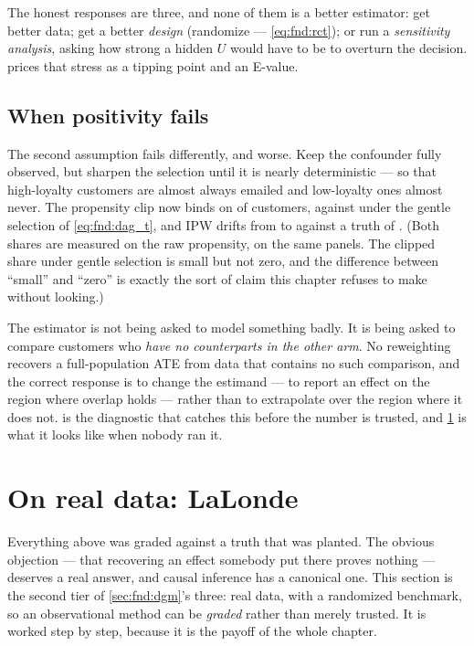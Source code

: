 The honest responses are three, and none of them is a better estimator: get better data; get a
better \emph{design} (randomize --- \cref{eq:fnd:rct}); or run a \emph{sensitivity analysis},
asking how strong a hidden $U$ would have to be to overturn the decision.  prices
that stress as a tipping point and an E-value.

\subsection*{When positivity fails}

The second assumption fails differently, and worse. Keep the confounder fully observed, but
sharpen the selection until it is nearly deterministic --- so that high-loyalty customers are
almost always emailed and low-loyalty ones almost never. The propensity clip now binds on
\pc{\nbZeroPosClipBad} of customers, against \pc{\nbZeroPosClipOk} under the gentle selection of
\cref{eq:fnd:dag_t}, and IPW drifts from \eur{\nbZeroPosIpwOk} to \eur{\nbZeroPosIpwBad} against
a truth of \eur{\nbZeroTrueDag}. (Both shares are measured on the raw propensity, on the same
panels. The clipped share under gentle selection is small but not zero, and the difference
between ``small'' and ``zero'' is exactly the sort of claim this chapter refuses to make without
looking.)

The estimator is not being asked to model something badly. It is being asked to compare customers
who \emph{have no counterparts in the other arm}. No reweighting recovers a full-population ATE
from data that contains no such comparison, and the correct response is to change the estimand
--- to report an effect on the region where overlap holds --- rather than to extrapolate over the
region where it does not.  is the diagnostic that catches this before the
number is trusted, and \cref{sec:fnd:real} is what it looks like when nobody ran it.

\section{On real data: LaLonde}
\label{sec:fnd:real}

Everything above was graded against a truth that was planted. The obvious objection --- that
recovering an effect somebody put there proves nothing --- deserves a real answer, and causal
inference has a canonical one. This section is the second tier of \cref{sec:fnd:dgm}'s three:
real data, with a randomized benchmark, so an observational method can be \emph{graded} rather
than merely trusted. It is worked step by step, because it is the payoff of the whole chapter.

